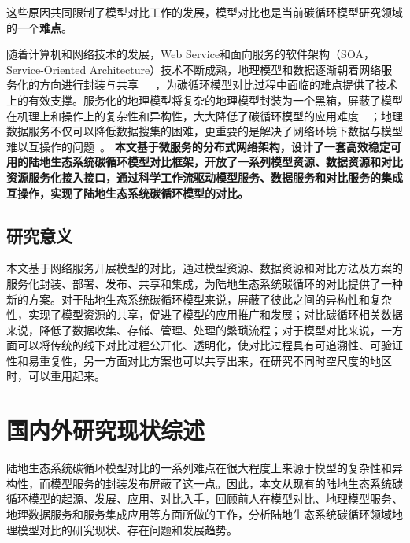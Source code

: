 这些原因共同限制了模型对比工作的发展，模型对比也是当前碳循环模型研究领域的一个\textbf{难点}。

随着计算机和网络技术的发展，Web Service和面向服务的软件架构（SOA，Service-Oriented Architecture）技术不断成熟，地理模型和数据逐渐朝着网络服务化的方向进行封装与共享~\cite{adgeo-4-69-2005}~\cite{peckham2009componentizing}~\cite{2015-hudi-2}，为碳循环模型对比过程中面临的难点提供了技术上的有效支撑。服务化的地理模型将复杂的地理模型封装为一个黑箱，屏蔽了模型在机理上和操作上的复杂性和异构性，大大降低了碳循环模型的应用难度~\cite{2015-hudi-2}~\cite{yue2016service}；地理数据服务不仅可以降低数据搜集的困难，更重要的是解决了网络环境下数据与模型难以互操作的问题~\cite{Yue2015A}。
\textbf{本文基于微服务的分布式网络架构，设计了一套高效稳定可用的陆地生态系统碳循环模型对比框架，开放了一系列模型资源、数据资源和对比资源服务化接入接口，通过科学工作流驱动模型服务、数据服务和对比服务的集成互操作，实现了陆地生态系统碳循环模型的对比。}

\subsection{研究意义}

本文基于网络服务开展模型的对比，通过模型资源、数据资源和对比方法及方案的服务化封装、部署、发布、共享和集成，为陆地生态系统碳循环的对比提供了一种新的方案。对于陆地生态系统碳循环模型来说，屏蔽了彼此之间的异构性和复杂性，实现了模型资源的共享，促进了模型的应用推广和发展；对比碳循环相关数据来说，降低了数据收集、存储、管理、处理的繁琐流程；对于模型对比来说，一方面可以将传统的线下对比过程公开化、透明化，使对比过程具有可追溯性、可验证性和易重复性，另一方面对比方案也可以共享出来，在研究不同时空尺度的地区时，可以重用起来。

\section{国内外研究现状综述}
陆地生态系统碳循环模型对比的一系列难点在很大程度上来源于模型的复杂性和异构性，而模型服务的封装发布屏蔽了这一点。因此，本文从现有的陆地生态系统碳循环模型的起源、发展、应用、对比入手，回顾前人在模型对比、地理模型服务、地理数据服务和服务集成应用等方面所做的工作，分析陆地生态系统碳循环领域地理模型对比的研究现状、存在问题和发展趋势。

